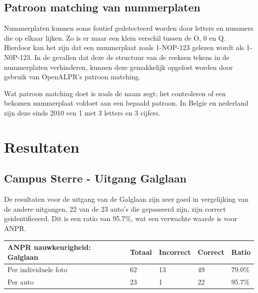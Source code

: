 \subsection{Patroon matching van nummerplaten}
Nummerplaten kunnen soms foutief gedetecteerd worden door letters en nummers die op elkaar lijken. Zo is er maar een klein verschil tussen de O, 0 en Q. 
Hierdoor kan het zijn dat een nummerplaat zoals 1-NOP-123 gelezen wordt als 1-N0P-123. In de gevallen dat deze de structuur van de reeksen tekens in de nummerplaten verhinderen, kunnen deze gemakkelijk opgelost worden door gebruik van OpenALPR's patroon matching.

Wat patroon matching doet is zoals de naam zegt; het controleren of een bekomen nummerplaat voldoet aan een bepaald patroon. In Belgie en nederland zijn deze sinds 2010 een 1 met 3 letters en 3 cijfers.

\section{Resultaten}

\subsection{Campus Sterre - Uitgang Galglaan}

De resultaten voor de uitgang van de Galglaan zijn zeer goed in vergelijking van de andere uitgangen, 22 van de 23 auto's die gepasseerd zijn, zijn correct geidentificeerd. Dit is een ratio van 95.7\%, wat een verwachte waarde is voor ANPR.

\begin{table}[h!]
	\centering
	\begin{tabular}{l|l|l|l|l}
\textbf{ANPR nauwkeurigheid: Galglaan} & Totaal & Incorrect & Correct & Ratio	\\ \hline
Per individuele foto 	& 62 & 13	& 49	& 79.0\%\\
Per auto				& 23 & 1	& 22 	& 95.7\%\\
\end{tabular}
\end{table}

